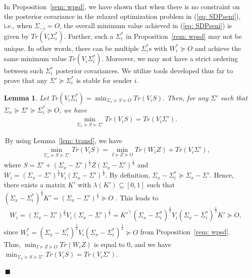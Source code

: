 \documentclass[12pt,journal,onecolumn]{IEEEtran}
\newtheorem{lemma}{Lemma}
\newenvironment{Proof}[1]{\medskip\par\noindent{\bf Proof:\,}\,#1}{{\mbox{\,$\blacksquare$}\par}}
\newcommand{\rknote}[1]{\noindent{\leavevmode\color{red}[Raj -- #1]}}
\begin{document}
In Proposition~\ref{rem: wpsd}, we have shown that when there is no constraint on the posterior covariance in the relaxed optimization problem in (\ref{eq: SDPseni}), i.e., when $\Sigma_{-i} = O$, the overall minimum value achieved in (\ref{eq: SDPseni}) is given by $Tr(V_i\Sigma^*_i)$. Further, such a $\Sigma^*_i$ in Proposition~\ref{rem: wpsd} may not be unique. In other words, there can be multiple $\Sigma^*_i$s with $W_i^*\succeq O$ and achieve the same minimum value $Tr(V_i\Sigma^*_i)$. Moreover, we may not have a strict ordering between such $\Sigma^*_i$ posterior covariances. We utilize tools developed thus far to prove that any $\Sigma'\succeq\Sigma_i^*$ is stable for sender $i$.

\begin{lemma}\label{lem: greatersig}
Let $Tr(V_i\Sigma^*_i)=\min_{\Sigma_x\succeq S\succeq O} Tr(V_iS)$. Then, for any $\Sigma'$ such that $\Sigma_x\succeq\Sigma'\succeq\Sigma^*_i\succeq O$, we have
\begin{align}
    \min_{\Sigma_x\succeq S\succeq\Sigma'} Tr(V_iS)= Tr(V_i\Sigma').
\end{align}
\end{lemma}
\begin{Proof}
By using Lemma~\ref{lem: transf}, we have
\begin{align*}
    \min_{\Sigma_x\succeq S\succeq\Sigma'} Tr(V_iS)=\min_{I\succeq Z\succeq O} Tr(W_iZ)+ Tr(V_i\Sigma'),
\end{align*}
where $S=\Sigma'+(\Sigma_x-\Sigma')^{\frac{1}{2}}Z(\Sigma_x-\Sigma')^{\frac{1}{2}}$ and $W_i=(\Sigma_x-\Sigma')^{\frac{1}{2}}V_i(\Sigma_x-\Sigma')^{\frac{1}{2}}$. By definition, $\Sigma_x-\Sigma_i^*\succeq\Sigma_x-\Sigma'$. Hence, there exists a matrix $K'$ with $\lambda (K')\subseteq[0,1]$ such that $(\Sigma_x-\Sigma_i^*)^\frac{1}{2}K'=(\Sigma_x-\Sigma')^{\frac{1}{2}}\succeq O$ \cite{gross2001lowner}. This leads to 
\begin{align*}
    W_i=(\Sigma_x-\Sigma')^{\frac{1}{2}}V_i(\Sigma_x-\Sigma')^{\frac{1}{2}}=K'^\top(\Sigma_x-\Sigma_i^*)^{\frac{1}{2}}V_i(\Sigma_x-\Sigma_i^*)^{\frac{1}{2}}K'\succeq O,
\end{align*}
since $W_i^*=(\Sigma_x-\Sigma_i^*)^{\frac{1}{2}}V_i(\Sigma_x-\Sigma_i^*)^{\frac{1}{2}}\succeq O$ from Proposition~\ref{rem: wpsd}. Thus, $\min_{I\succeq Z\succeq O} Tr(W_iZ)$ is equal to $0$, and we have $ \min_{\Sigma_x\succeq S\succeq\Sigma'} Tr(V_iS) =Tr(V_i\Sigma')$. 
\end{Proof}
\end{document}
